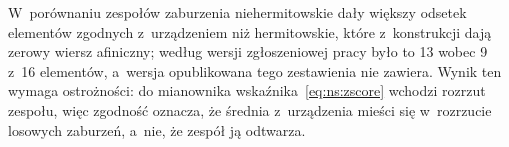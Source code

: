 W~porównaniu zespołów zaburzenia niehermitowskie dały większy odsetek elementów zgodnych z~urządzeniem niż hermitowskie, które z~konstrukcji dają zerowy wiersz afiniczny; według wersji zgłoszeniowej pracy było to 13 wobec 9 z~16 elementów, a~wersja opublikowana tego zestawienia nie zawiera.
Wynik ten wymaga ostrożności: do mianownika wskaźnika~\eqref{eq:ns:zscore} wchodzi rozrzut zespołu, więc zgodność oznacza, że średnia z~urządzenia mieści się w~rozrzucie losowych zaburzeń, a~nie, że zespół ją odtwarza.


